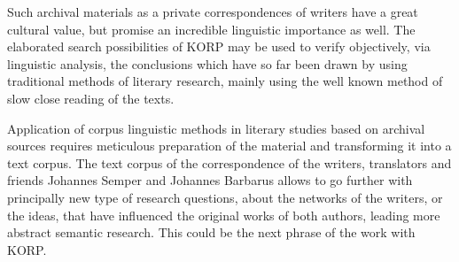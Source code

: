\documentclass[runningheads]{llncs}
\begin{document}
Such archival materials as a private correspondences of writers have a great cultural value, but promise an incredible linguistic importance as well. The elaborated search possibilities of KORP may be used to verify objectively, via linguistic analysis, the conclusions which have so far been drawn by using traditional methods of literary research, mainly using the well known method of slow close reading of the texts. 

Application of corpus linguistic methods in literary studies based on archival sources requires meticulous preparation of the material and transforming it into a text corpus. The text corpus of the correspondence of the writers, translators and friends Johannes Semper and Johannes Barbarus allows to go further with principally new type of research  questions, about the networks of the writers, or the ideas, that have influenced  the original works of both authors, leading more abstract semantic research. This could be the next phrase of the work with KORP.





%
%
%


%
\end{document}
